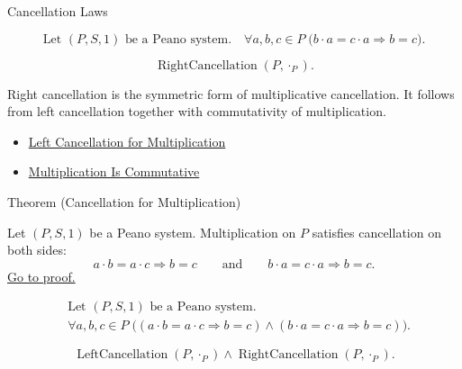 \begin{topicbox}{Cancellation Laws}
\begin{remark*}
\[
\text{Let } (P,S,1) \text{ be a Peano system.}\quad
\forall a,b,c \in P\;\bigl(b\cdot a=c\cdot a \Longrightarrow b=c\bigr).
\]
\end{remark*}

\begin{remark*}
\[
\operatorname{RightCancellation}(P,\cdot_P).
\]
\end{remark*}

\begin{remark*}[Interpretation]
Right cancellation is the symmetric form of multiplicative cancellation. It
follows from left cancellation together with commutativity of multiplication.
\end{remark*}

\begin{dependencies}
\begin{itemize}
  \item \hyperref[thm:multiplication-left-cancellation]{Left Cancellation for Multiplication}
  \item \hyperref[thm:multiplication-commutative]{Multiplication Is Commutative}
\end{itemize}
\end{dependencies}

\begin{theorembox}{Theorem (Cancellation for Multiplication)}
\begin{theorem}
\label{thm:multiplication-cancellation}
Let $(P,S,1)$ be a Peano system. Multiplication on $P$ satisfies cancellation
on both sides:
\[
a\cdot b=a\cdot c\Longrightarrow b=c
\qquad\text{and}\qquad
b\cdot a=c\cdot a\Longrightarrow b=c.
\]
\hyperref[prf:multiplication-cancellation]{Go to proof.}
\end{theorem}
\end{theorembox}

\begin{remark*}
\[
\begin{aligned}
&\text{Let } (P,S,1) \text{ be a Peano system.}\\
&\forall a,b,c \in P\;
\bigl((a\cdot b=a\cdot c \Longrightarrow b=c)
\land
(b\cdot a=c\cdot a \Longrightarrow b=c)\bigr).
\end{aligned}
\]
\end{remark*}

\begin{remark*}
\[
\operatorname{LeftCancellation}(P,\cdot_P)
\land
\operatorname{RightCancellation}(P,\cdot_P).
\]
\end{remark*}


\end{topicbox}
